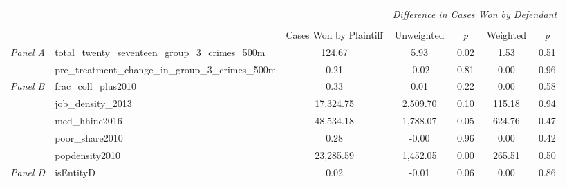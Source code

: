 \begin{tabular}{llccccc}
\toprule
 &  & \textit{} & \multicolumn{4}{c}{\textit{Difference in Cases Won by Defendant}} \\
\cline{4-7}
\\
 &  & Cases Won by Plaintiff & Unweighted & \emph{p} & Weighted & \emph{p} \\
\midrule
\multirow[c]{2}{3cm}{\textit{Panel A}} & total_twenty_seventeen_group_3_crimes_500m & 124.67 & 5.93 & 0.02 & 1.53 & 0.51 \\
 & pre_treatment_change_in_group_3_crimes_500m & 0.21 & -0.02 & 0.81 & 0.00 & 0.96 \\
\cline{1-7}
\multirow[c]{5}{3cm}{\textit{Panel B}} & frac_coll_plus2010 & 0.33 & 0.01 & 0.22 & 0.00 & 0.58 \\
 & job_density_2013 & 17,324.75 & 2,509.70 & 0.10 & 115.18 & 0.94 \\
 & med_hhinc2016 & 48,534.18 & 1,788.07 & 0.05 & 624.76 & 0.47 \\
 & poor_share2010 & 0.28 & -0.00 & 0.96 & 0.00 & 0.42 \\
 & popdensity2010 & 23,285.59 & 1,452.05 & 0.00 & 265.51 & 0.50 \\
\cline{1-7}
\textit{Panel D} & isEntityD & 0.02 & -0.01 & 0.06 & 0.00 & 0.86 \\
\cline{1-7}
\bottomrule
\end{tabular}
